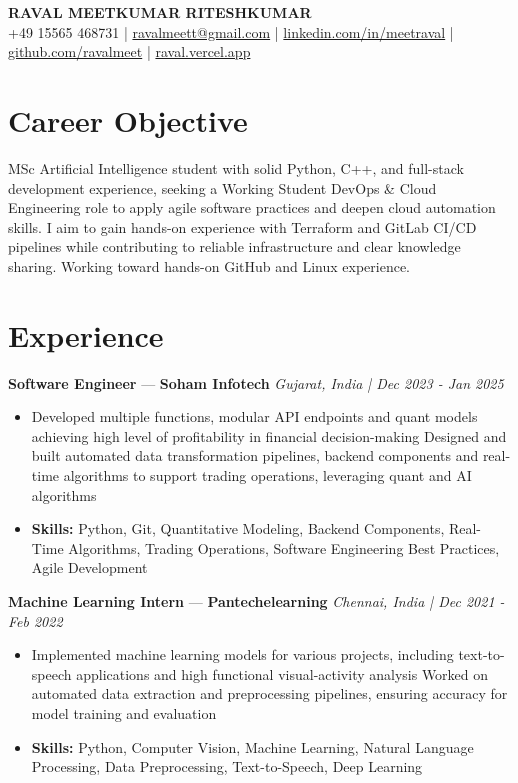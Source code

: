 \documentclass[a4paper,10pt]{article}
\begin{document}
\begin{center}
  {\Large\bfseries RAVAL MEETKUMAR RITESHKUMAR}\\[2pt]
  {\small +49 15565 468731 \;|\; \href{mailto:ravalmeett@gmail.com}{ravalmeett@gmail.com} \;|\; \href{https://www.linkedin.com/in/meetraval/}{linkedin.com/in/meetraval} \;|\; \href{https://github.com/ravalmeet}{github.com/ravalmeet} \;|\; \href{https://raval.vercel.app/}{raval.vercel.app}}
\end{center}
\vspace{-3pt}

\section*{Career Objective}
MSc Artificial Intelligence student with solid Python, C++, and full-stack development experience, seeking a Working Student DevOps \& Cloud Engineering role to apply agile software practices and deepen cloud automation skills. I aim to gain hands-on experience with Terraform and GitLab CI/CD pipelines while contributing to reliable infrastructure and clear knowledge sharing. Working toward hands-on GitHub and Linux experience.\par

\section*{Experience}
\textbf{Software Engineer} — \textbf{Soham Infotech} \hfill \textit{Gujarat, India \;|\; Dec 2023 - Jan 2025}\par
\vspace{1pt}
\begin{itemize}
  \item Developed multiple functions, modular API endpoints and quant models achieving high level of profitability in financial decision-making Designed and built automated data transformation pipelines, backend components and real-time algorithms to support trading operations, leveraging quant and AI algorithms
  \item \textbf{Skills:} Python, Git, Quantitative Modeling, Backend Components, Real-Time Algorithms, Trading Operations, Software Engineering Best Practices, Agile Development
\end{itemize}
\vspace{3pt}
\textbf{Machine Learning Intern} — \textbf{Pantechelearning} \hfill \textit{Chennai, India \;|\; Dec 2021 - Feb 2022}\par
\vspace{1pt}
\begin{itemize}
  \item Implemented machine learning models for various projects, including text-to-speech applications and high functional visual-activity analysis Worked on automated data extraction and preprocessing pipelines, ensuring accuracy for model training and evaluation
  \item \textbf{Skills:} Python, Computer Vision, Machine Learning, Natural Language Processing, Data Preprocessing, Text-to-Speech, Deep Learning
\end{itemize}
\end{document}
